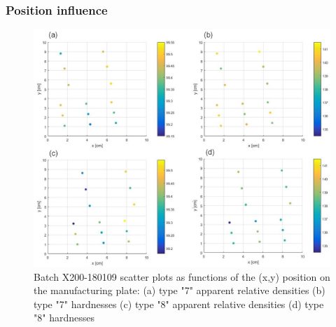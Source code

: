  
 \begin{center}
\begin{table}[ht]
\noindent{}

\caption[Minimal and maximal values for apparent relative densities and hardnesses of types "7" and "8" specimens of batch X200-180109]{Minimal and maximal values for apparent relative densities and hardnesses of types "7" and "8" specimens of batch X200-180109}
\label{tab:78bb}
\end{table}
 \end{center}


\subsubsection{Position influence}

\begin{figure}[ht]
\centering
\centerline{\includegraphics[scale=0.62]{Images/180109-HD}}
\decoRule
\caption[Batch X200-180109 scatter plots as functions of the (x,y) position on the manufacturing plate: (a) type "7" apparent relative densities (b) type "7" hardnesses (c) type "8" apparent relative densities (d) type "8" hardnesses]{Batch X200-180109 scatter plots as functions of the (x,y) position on the manufacturing plate: (a) type "7" apparent relative densities (b) type "7" hardnesses (c) type "8" apparent relative densities (d) type "8" hardnesses}
\label{fig:180109-HD}
\end{figure} 



